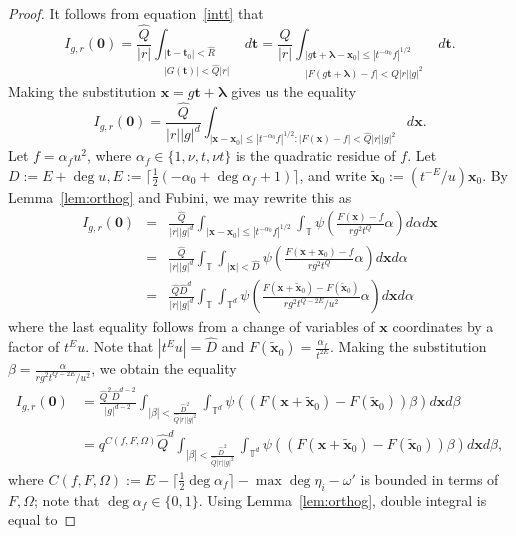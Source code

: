 \documentclass[10pt]{amsart}
\theoremstyle{plain}
\theoremstyle{plain}
\renewcommand{\vec}[1]{\mathbf{#1}}
\theoremstyle{remark}
\theoremstyle{definition}
\renewcommand{\hat}{\widehat}
\newcommand{\hQ}{\widehat{Q}}
\newcommand{\TT}{\mathbb{T}}
\begin{document}
\begin{proof}
It follows from equation~\eqref{intt} that
\[I_{g,r}(\vec{0})=\frac{\hQ}{|r|} \int_{\substack{|\vec{t}-\vec{t}_0|< \hat{R}\\ |G(\vec{t})|< \hQ|r|}} d\vec{t}=\frac{\hQ}{|r|} \int_{\substack{|g\vec{t}+\boldsymbol{\lambda}-\vec{x}_0| \leq |t^{-\alpha_0}f|^{1/2}\\ |F(g\vec{t}+\boldsymbol{\lambda})-f|<\hQ|r||g|^2}} d\vec{t}.\]
Making the substitution $\vec{x}=g\vec{t}+\boldsymbol{\lambda}$ gives us the equality
\[I_{g,r}(\vec{0})=\frac{\hQ}{|r||g|^d}\int_{|\vec{x}-\vec{x}_0|\leq |t^{-\alpha_0}f|^{1/2}:|F(\vec{x})-f|< \hQ|r||g|^2}d\vec{x}.\]
Let $f=\alpha_fu^2$, where $\alpha_f\in\{1,\nu,t,\nu t\}$ is the quadratic residue of $f$. Let $D:=E+\deg u, E:=\lceil\frac{1}{2}(-\alpha_0+\deg \alpha_f+1)\rceil$, and write $\tilde{\vec{x}}_0:=(t^{-E}/u)\vec{x}_0$. By Lemma~\ref{lem:orthog} and Fubini, we may rewrite this as
\begin{eqnarray*}I_{g,r}(\vec{0})&=&\frac{\hQ}{|r||g|^d}\int_{|\vec{x}-\vec{x}_0|\leq |t^{-\alpha_0}f|^{1/2}}\int_{\TT}\psi\left(\frac{F(\vec{x})-f}{rg^2t^{Q}}\alpha\right)d\alpha d\vec{x}\\ &=&\frac{\hQ}{|r||g|^d}\int_{\TT}\int_{|\vec{x}|< \hat{D}}\psi\left(\frac{F(\vec{x}+\vec{x}_0)-f}{rg^2t^Q}\alpha\right)d\vec{x}d\alpha\\ &=& \frac{\hQ\hat{D}^d}{|r||g|^d}\int_{\TT}\int_{\TT^d}\psi\left(\frac{F(\vec{x}+\tilde{\vec{x}}_0)-F(\tilde{\vec{x}}_0)}{rg^2t^{Q-2E}/u^2}\alpha\right)d\vec{x}d\alpha
\end{eqnarray*}
where the last equality follows from a change of variables of $\vec{x}$ coordinates by a factor of $t^Eu$. Note that $|t^Eu|=\hat{D}$ and $F(\tilde{\vec{x}}_0)=\frac{\alpha_f}{t^{2E}}$. Making the substitution $\beta=\frac{\alpha}{rg^2t^{Q-2E}/u^2}$, we obtain the equality
\begin{align}\label{integralIzero}I_{g,r}(\vec{0})&=\frac{\hQ^2\hat{D}^{d-2}}{|g|^{d-2}}\int_{|\beta|<\frac{\hat{D}^2}{\hQ|r||g|^2}}\int_{\TT^d}\psi\left((F(\vec{x}+\tilde{\vec{x}}_0)-F(\tilde{\vec{x}}_0))\beta\right)d\vec{x}d\beta\nonumber\\&=
q^{C(f,F,\Omega)}\hQ^d\int_{|\beta|<\frac{\hat{D}^2}{\hQ|r||g|^2}}\int_{\TT^d}\psi\left((F(\vec{x}+\tilde{\vec{x}}_0)-F(\tilde{\vec{x}}_0))\beta\right)d\vec{x}d\beta,\end{align}
where $C(f,F,\Omega):=E-\lceil\frac{1}{2}\deg\alpha_f\rceil-\max\deg\eta_i-\omega'$ is bounded in terms of $F,\Omega$; note that $\deg\alpha_f\in\{0,1\}$. Using Lemma~\ref{lem:orthog}, double integral is equal to

\end{proof}
\end{document}
